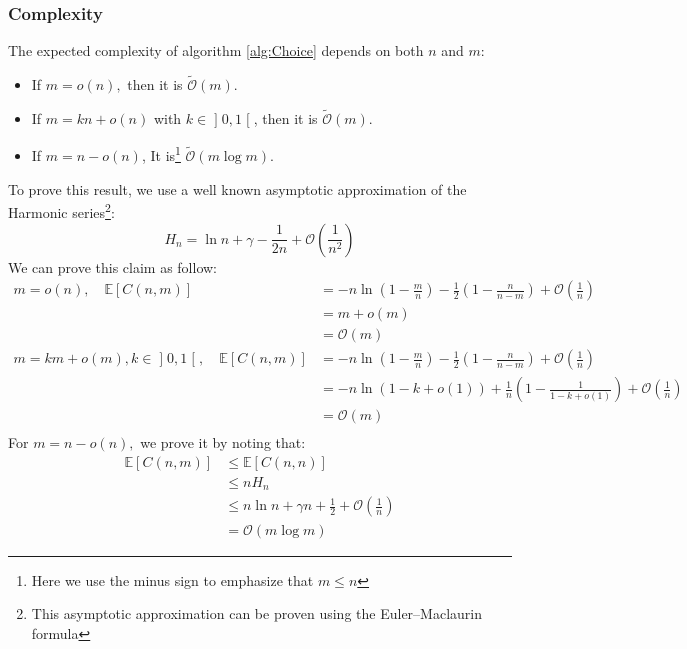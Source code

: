 \subsubsection{Complexity}
The expected complexity of algorithm \ref{alg:Choice} depends on both $n$ and $m$:
\begin{itemize}
	\item If $m=o(n),$ then it is $\tilde{\mathcal{O}}(m).$
	\item If $m=kn+o(n)$ with $k\in\mathopen]0,1\mathclose[$, then it is $\tilde{\mathcal{O}}(m).$
	\item If $m=n-o(n)$, It is\footnote{Here we use the minus sign to emphasize that $m\le n$} $\tilde{\mathcal{O}}(m\log m).$ 
\end{itemize}
To prove this result, we use a well known asymptotic approximation of the Harmonic series\footnote{This asymptotic approximation can be proven using the Euler–Maclaurin formula}:
$$
H_n=\ln n+\gamma -\frac{1}{2n}+\mathcal{O}\left(\frac{1}{n^2}\right)
$$
We can prove this claim as follow:
\begin{align*}
	m=o(n),\quad \mathbb{E}[C(n,m)]&=-n\ln \left(1-\frac{m}{n}\right) -\frac{1}{2}\left(1-\frac{n}{n-m}\right)+\mathcal{O}\left(\frac{1}{n}\right) \\
	&=m+o(m)\\
	&=\mathcal{O}(m)\\
	m=km+o(m),k\in \mathopen]0,1\mathclose[,\quad \mathbb{E}[C(n,m)]&=-n\ln \left(1-\frac{m}{n}\right) -\frac{1}{2}\left(1-\frac{n}{n-m}\right)+\mathcal{O}\left(\frac{1}{n}\right) \\
&=-n\ln (1-k+o(1))+\frac{1}{n}(1-\tfrac{1}{1-k+o(1)})+\mathcal{O}(\tfrac{1}{n})\\
&=\mathcal{O}(m)\\
\end{align*}
For $m=n-o(n),$ we prove it by noting that:
\begin{align*}
\mathbb{E}[C(n,m)]&\le\mathbb{E}[C(n,n)] \\
 &\le nH_n \\
&\le n\ln n +\gamma n +\frac{1}{2}+\mathcal{O}\left(\frac{1}{n}\right) \\
&= \mathcal{O}(m\log m)
\end{align*}

